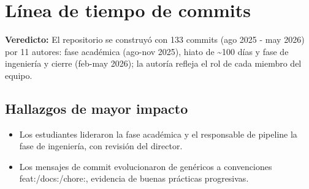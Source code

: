 \section{Línea de tiempo de commits}

\begin{tcolorbox}[hallazgo]
\textbf{Veredicto:} El repositorio se construyó con 133 commits (ago 2025 - may 2026) por 11 autores: fase académica (ago-nov 2025), hiato de \textasciitilde{}100 días y fase de ingeniería y cierre (feb-may 2026); la autoría refleja el rol de cada miembro del equipo.

\end{tcolorbox}

\subsection{Hallazgos de mayor impacto}

\begin{itemize}
  \item Los estudiantes lideraron la fase académica y el responsable de pipeline la fase de ingeniería, con revisión del director.
  \item Los mensajes de commit evolucionaron de genéricos a convenciones feat:/docs:/chore:, evidencia de buenas prácticas progresivas.
\end{itemize}
